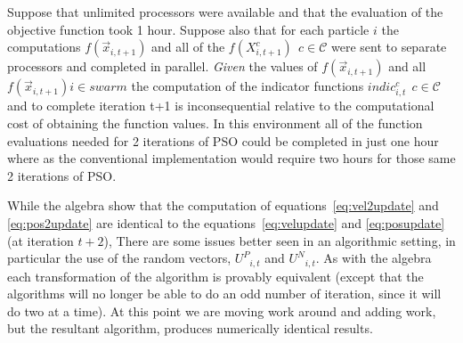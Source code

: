 \documentclass[journal,letterpaper]{IEEEtran}
\providecommand{\pers}{\ensuremath{P}}
\providecommand{\neigh}{\ensuremath{N}}
\providecommand{\nURand}{\ensuremath{U^\neigh}}
\providecommand{\pURand}{\ensuremath{U^\pers}}
\providecommand{\ppos}{\ensuremath{\Vec{x}}}
\providecommand{\ofunc}{\ensuremath{f}}
\providecommand{\swarm}{\ensuremath{swarm}}
\providecommand{\specpos}{\ensuremath{X}}
\providecommand{\caseset}{\ensuremath{\mathcal{C}}}
\begin{document}
Suppose that unlimited processors were available and that the evaluation of 
the objective function took 1 hour. Suppose also that for each particle $i$ 
the computations
$\ofunc(\ppos_{i,t+1})$ and all 
of the $\ofunc(\specpos_{i,t+1}^{c}) \ \ c \in \caseset$ were sent to separate
processors and completed in parallel.
\emph{Given} the values 
of $\ofunc(\ppos_{i,t+1})$ and all 
$\ofunc(\ppos_{i,t+1}) i \in \swarm$ 
the computation of the indicator functions $indic_{i,t}^{c} \ \ c \in \caseset$ and to complete iteration t+1
is inconsequential relative to the computational cost of obtaining the function values. 
In this environment all of the function evaluations needed for 2 iterations of PSO
could be completed in just one hour where as the conventional implementation would
require two hours for those same 2 iterations of PSO.

While the algebra show that the computation of 
equations~\eqref{eq:vel2update} and \eqref{eq:pos2update} are identical to the 
equations~\eqref{eq:velupdate} and \eqref{eq:posupdate} (at iteration $t+2$),
There are some issues better seen in an algorithmic setting, in particular the use of the random
vectors, 
$\pURand_{i,t}$ and $\nURand_{i,t}$. As with the algebra each transformation of the algorithm is
provably equivalent (except that the algorithms will no longer be able to do an odd number of iteration,
since it will do two at a time). At this point we are moving work around and adding work, but the
resultant algorithm, produces numerically identical results.
\end{document}
